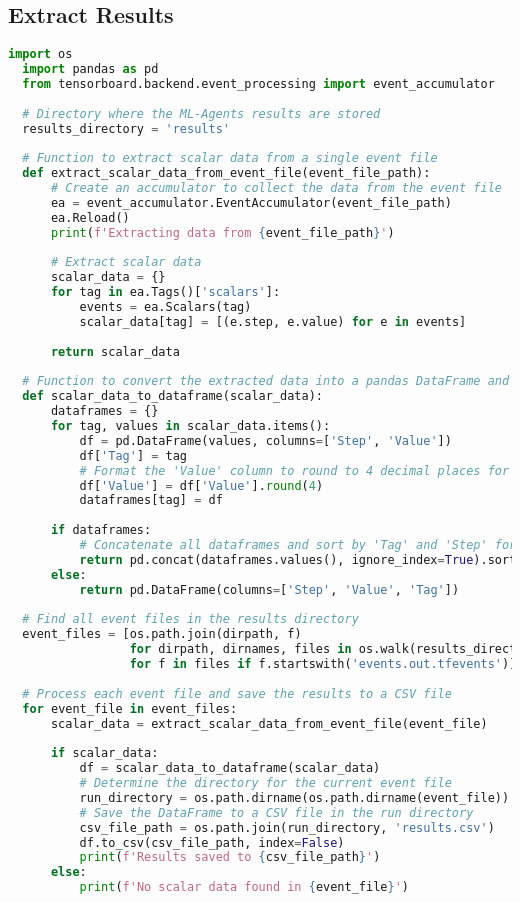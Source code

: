\subsection{Extract Results}\label{sec:extract_results}
\begin{lstlisting}[language=Python]
  import os
  import pandas as pd
  from tensorboard.backend.event_processing import event_accumulator
  
  # Directory where the ML-Agents results are stored
  results_directory = 'results'
  
  # Function to extract scalar data from a single event file
  def extract_scalar_data_from_event_file(event_file_path):
      # Create an accumulator to collect the data from the event file
      ea = event_accumulator.EventAccumulator(event_file_path)
      ea.Reload()
      print(f'Extracting data from {event_file_path}')
      
      # Extract scalar data
      scalar_data = {}
      for tag in ea.Tags()['scalars']:
          events = ea.Scalars(tag)
          scalar_data[tag] = [(e.step, e.value) for e in events]
      
      return scalar_data
  
  # Function to convert the extracted data into a pandas DataFrame and format it for readability
  def scalar_data_to_dataframe(scalar_data):
      dataframes = {}
      for tag, values in scalar_data.items():
          df = pd.DataFrame(values, columns=['Step', 'Value'])
          df['Tag'] = tag
          # Format the 'Value' column to round to 4 decimal places for readability
          df['Value'] = df['Value'].round(4)
          dataframes[tag] = df
  
      if dataframes:
          # Concatenate all dataframes and sort by 'Tag' and 'Step' for better readability
          return pd.concat(dataframes.values(), ignore_index=True).sort_values(by=['Tag', 'Step'])
      else:
          return pd.DataFrame(columns=['Step', 'Value', 'Tag'])
  
  # Find all event files in the results directory
  event_files = [os.path.join(dirpath, f)
                 for dirpath, dirnames, files in os.walk(results_directory)
                 for f in files if f.startswith('events.out.tfevents')]
  
  # Process each event file and save the results to a CSV file
  for event_file in event_files:
      scalar_data = extract_scalar_data_from_event_file(event_file)
      
      if scalar_data:
          df = scalar_data_to_dataframe(scalar_data)
          # Determine the directory for the current event file
          run_directory = os.path.dirname(os.path.dirname(event_file))
          # Save the DataFrame to a CSV file in the run directory
          csv_file_path = os.path.join(run_directory, 'results.csv')
          df.to_csv(csv_file_path, index=False)
          print(f'Results saved to {csv_file_path}')
      else:
          print(f'No scalar data found in {event_file}')

\end{lstlisting}

